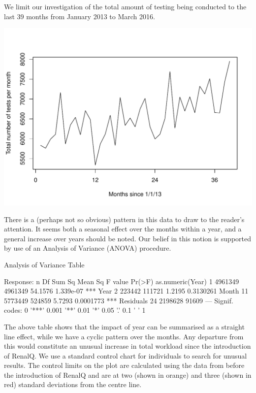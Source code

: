 


We limit our investigation of the total amount of testing being conducted to the last 39 months from January 2013 to March 2016.

\includegraphics{Figures/Monthly-TSPlot}


There is a (perhaps not so obvious) pattern in this data to draw to the reader's attention. It seems both a seasonal effect over the months within a year, and a general increase over years should be noted.  Our belief in this notion is supported by use of an Analysis of Variance (ANOVA) procedure.


\begin{Schunk}
\begin{Soutput}
Analysis of Variance Table

Response: n
                 Df  Sum Sq Mean Sq F value    Pr(>F)    
as.numeric(Year)  1 4961349 4961349 54.1576 1.339e-07 ***
Year              2  223442  111721  1.2195 0.3130261    
Month            11 5773449  524859  5.7293 0.0001773 ***
Residuals        24 2198628   91609                      
---
Signif. codes:  0 '***' 0.001 '**' 0.01 '*' 0.05 '.' 0.1 ' ' 1
\end{Soutput}
\end{Schunk}



The above table shows that the impact of year can be summarised as a straight line effect, while we have a cyclic pattern over the months. Any departure from this would constitute an unusual increase in total workload since the introduction of RenalQ. We use a standard control chart for individuals to search for unusual results. The control limits on the plot are calculated using the data from before the introduction of RenalQ and are at two (shown in orange) and three (shown in red) standard deviations from the centre line.

